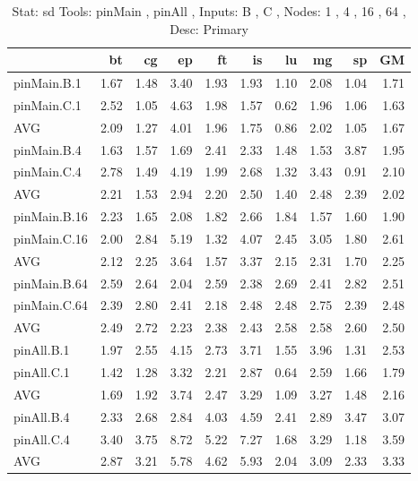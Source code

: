 \begin{table*}[]
\caption{Stat: sd 
 Tools: pinMain , pinAll ,  
 Inputs: B , C ,  
 Nodes: 1 , 4 , 16 , 64 ,  
 Desc: Primary}
\label{ls5_sd_pMpA_BC_tni_p3.5}\begin{center}
\begin{tabular}{lrrrrrrrrr}
\hline
              &   bt &   cg &   ep &   ft &   is &   lu &   mg &   sp &   GM \\
\hline
 pinMain.B.1  & 1.67 & 1.48 & 3.40 & 1.93 & 1.93 & 1.10 & 2.08 & 1.04 & 1.71 \\
 pinMain.C.1  & 2.52 & 1.05 & 4.63 & 1.98 & 1.57 & 0.62 & 1.96 & 1.06 & 1.63 \\
 AVG          & 2.09 & 1.27 & 4.01 & 1.96 & 1.75 & 0.86 & 2.02 & 1.05 & 1.67 \\
 pinMain.B.4  & 1.63 & 1.57 & 1.69 & 2.41 & 2.33 & 1.48 & 1.53 & 3.87 & 1.95 \\
 pinMain.C.4  & 2.78 & 1.49 & 4.19 & 1.99 & 2.68 & 1.32 & 3.43 & 0.91 & 2.10 \\
 AVG          & 2.21 & 1.53 & 2.94 & 2.20 & 2.50 & 1.40 & 2.48 & 2.39 & 2.02 \\
 pinMain.B.16 & 2.23 & 1.65 & 2.08 & 1.82 & 2.66 & 1.84 & 1.57 & 1.60 & 1.90 \\
 pinMain.C.16 & 2.00 & 2.84 & 5.19 & 1.32 & 4.07 & 2.45 & 3.05 & 1.80 & 2.61 \\
 AVG          & 2.12 & 2.25 & 3.64 & 1.57 & 3.37 & 2.15 & 2.31 & 1.70 & 2.25 \\
 pinMain.B.64 & 2.59 & 2.64 & 2.04 & 2.59 & 2.38 & 2.69 & 2.41 & 2.82 & 2.51 \\
 pinMain.C.64 & 2.39 & 2.80 & 2.41 & 2.18 & 2.48 & 2.48 & 2.75 & 2.39 & 2.48 \\
 AVG          & 2.49 & 2.72 & 2.23 & 2.38 & 2.43 & 2.58 & 2.58 & 2.60 & 2.50 \\
 pinAll.B.1   & 1.97 & 2.55 & 4.15 & 2.73 & 3.71 & 1.55 & 3.96 & 1.31 & 2.53 \\
 pinAll.C.1   & 1.42 & 1.28 & 3.32 & 2.21 & 2.87 & 0.64 & 2.59 & 1.66 & 1.79 \\
 AVG          & 1.69 & 1.92 & 3.74 & 2.47 & 3.29 & 1.09 & 3.27 & 1.48 & 2.16 \\
 pinAll.B.4   & 2.33 & 2.68 & 2.84 & 4.03 & 4.59 & 2.41 & 2.89 & 3.47 & 3.07 \\
 pinAll.C.4   & 3.40 & 3.75 & 8.72 & 5.22 & 7.27 & 1.68 & 3.29 & 1.18 & 3.59 \\
 AVG          & 2.87 & 3.21 & 5.78 & 4.62 & 5.93 & 2.04 & 3.09 & 2.33 & 3.33 \\

\end{tabular}
\end{center}
\end{table*}
